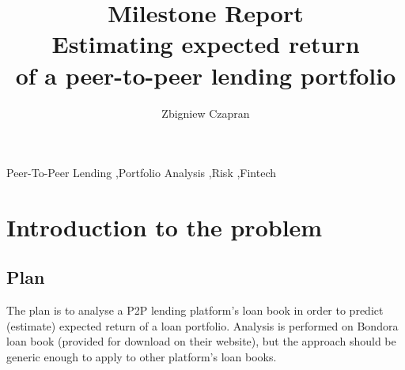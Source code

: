 \documentclass[preprint,12pt]{elsarticle}
\begin{document}
\begin{frontmatter}


\title{\textbf{Milestone Report} \protect\\ Estimating expected return \protect\\ of a peer-to-peer lending portfolio}




\author{Zbigniew Czapran}

\address{London, United Kingdom}

\begin{keyword}
Peer-To-Peer Lending \sep Portfolio Analysis \sep Risk \sep Fintech
\end{keyword}

\end{frontmatter}


\section{Introduction to the problem}
\label{S:1}

\subsection{Plan}

The plan is to analyse a P2P lending platform's loan book in order to predict (estimate) expected return of a loan portfolio. Analysis is performed on Bondora loan book (provided for download on their website), but the approach should be generic enough to apply to other platform's loan books.
\end{document}
